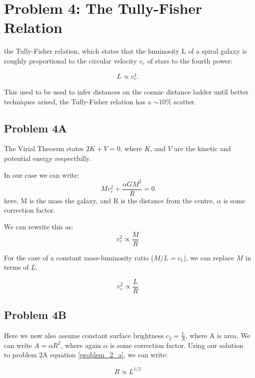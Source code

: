 \section*{Problem 4: The Tully-Fisher Relation}

the Tully-Fisher relation, which states that the
luminosity L of a spiral galaxy is roughly proportional to the circular velocity $v_c$ of stars to the fourth power:

\begin{equation}
    L \propto v^4_c.
\end{equation}

This used to be used to infer distances on the cosmic distance ladder until better techniques arised, the Tully-Fisher relation has a $\sim 10\%$ scatter. 

\subsection*{Problem 4A}

The Virial Theorem states $2K + V = 0$, where $K$, and $V$ are the kinetic and potential energy respectfully. 

In our case we can write:
\begin{equation}
    Mv_c^2 + \frac{\alpha GM^2}{R} = 0
\end{equation}
here, M is the mass the galaxy, and R is the distance from the centre, $\alpha$ is some correction factor.

We can rewrite this as:
\begin{equation}
    v_c^2 \propto \frac{M}{R}
\end{equation}


For the case of a constant mass-luminosity ratio ($M/L = c_1$), we can replace $M$ in terms of $L$. 

\begin{equation} \label{problem_2_a}
    \boxed{v_c^2 \propto \frac{L}{R}}
\end{equation}

\subsection*{Problem 4B}
Here we now also assume constant surface brightness $c_2 = \frac{L}{A}$, where A is area. We can write $A = \alpha R^2$, where again $\alpha$ is some correction factor. Using our solution to problem 2A equation \ref{problem_2_a}, we can write:

\begin{equation}
    R \propto L^{1/2}
\end{equation}

